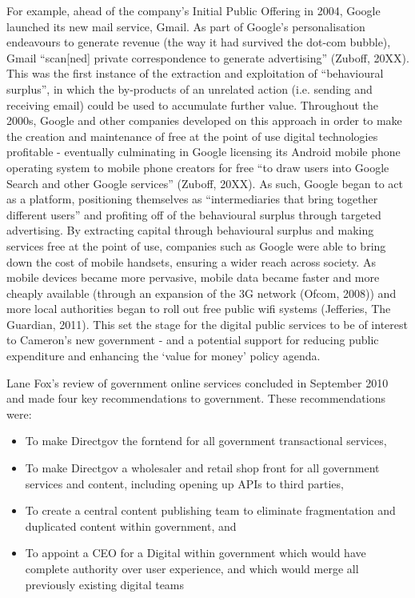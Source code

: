 For example, ahead of the company's Initial Public Offering in 2004,
Google launched its new mail service, Gmail. As part of Google's
personalisation endeavours to generate revenue (the way it had survived
the dot-com bubble), Gmail ``scan{[}ned{]} private correspondence to
generate advertising'' (Zuboff, 20XX). This was the first instance of
the extraction and exploitation of ``behavioural surplus'', in which the
by-products of an unrelated action (i.e. sending and receiving email)
could be used to accumulate further value. Throughout the 2000s, Google
and other companies developed on this approach in order to make the
creation and maintenance of free at the point of use digital
technologies profitable - eventually culminating in Google licensing its
Android mobile phone operating system to mobile phone creators for free
``to draw users into Google Search and other Google services'' (Zuboff,
20XX). As such, Google began to act as a platform, positioning
themselves as ``intermediaries that bring together different users'' and
profiting off of the behavioural surplus through targeted advertising.
By extracting capital through behavioural surplus and making services
free at the point of use, companies such as Google were able to bring
down the cost of mobile handsets, ensuring a wider reach across society.
As mobile devices became more pervasive, mobile data became faster and
more cheaply available (through an expansion of the 3G network (Ofcom,
2008)) and more local authorities began to roll out free public wifi
systems (Jefferies, The Guardian, 2011). This set the stage for the
digital public services to be of interest to Cameron's new government -
and a potential support for reducing public expenditure and enhancing
the `value for money' policy agenda.

Lane Fox's review of government online services concluded in September
2010 and made four key recommendations to government. These
recommendations were:

\begin{itemize}
\item
  To make Directgov the forntend for all government transactional
  services,
\item
  To make Directgov a wholesaler and retail shop front for all
  government services and content, including opening up APIs to third
  parties,
\item
  To create a central content publishing team to eliminate fragmentation
  and duplicated content within government, and
\item
  To appoint a CEO for a Digital within government which would have
  complete authority over user experience, and which would merge all
  previously existing digital teams
\end{itemize}

